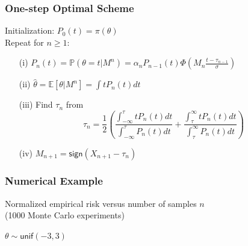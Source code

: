 \documentclass[mathserif]{beamer}
\newcommand{\sgn}{\mathsf{sign}}
\newcommand{\unif}{\mathsf{unif}}
\newcommand{\Prob}{\mathbb{P}}
\begin{document}
\begin{frame}
\frametitle{One-step Optimal Scheme}
Initialization: $P_0(t) = \pi(\theta)$ \\
Repeat for $n \geq 1$:
\begin{itemize}
\item[(i)] $P_n(t) = \Prob(\theta = t|M^n) = \alpha_n P_{n-1}(t) \Phi \left(M_n \frac{t-\tau_{n-1}}{\sigma} \right)$ 
\item[(ii)] $\widehat{\theta} = \mathbb E[\theta | M^n] = \int t P_n(t)dt $ 
\item[(iii)] Find $\tau_n$ from 
\[
\tau_n = \frac{1}{2} \left( \frac{ \int_{-\infty}^\tau t P_n(t)dt }{\int_{-\infty}^\tau P_n(t)dt}  + \frac{ \int_{\tau}^\infty t P_n(t)dt}{\int_{\tau}^\infty P_n(t)dt} \right)
\]
\item[(iv)] $M_{n+1} = \sgn(X_{n+1}-\tau_n)$
\end{itemize}
\end{frame}

\begin{frame}
\frametitle{Numerical Example}
\begin{center}
Normalized empirical risk versus number of samples $n$ \\
(1000 Monte Carlo experiments)
$\theta \sim \unif(-3,3)$
\end{center}
\end{frame}
\end{document}
